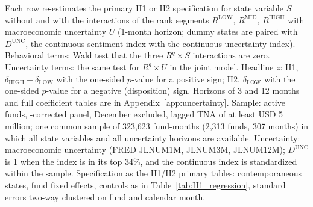 \begin{table}[!htbp]
\centering
\def\sbetab{%
\tablefont
\setlength{\tabcolsep}{4pt}%
\begin{tabular}{llccccc}
\toprule
 & & \multicolumn{2}{c}{Behavioral terms: joint $\chi^2_3$ ($p$)} & Uncertainty terms & \multicolumn{2}{c}{Headline $z$ ($p$)} \\
\cmidrule(lr){3-4}\cmidrule(lr){5-5}\cmidrule(lr){6-7}
Hyp. & State & Without $U$ & With $U$ & $\chi^2_3$ ($p$), with $S$ & Without $U$ & With $U$ \\
\midrule
H1 & $D^{\text{SENT}}$ & 6.13 (0.106) & 3.43 (0.330) & 4.85 (0.183) & $-$0.68 (0.750) & $-$1.12 (0.869) \\
H1 & $\text{SENT}^\perp$ & 7.71 (0.052) & 4.49 (0.213) & 4.53 (0.210) & +0.05 (0.481) & $-$0.11 (0.544) \\
H1 & $D^{\text{AAII}}$ & 14.22 (0.003) & 14.09 (0.003) & 7.82 (0.050) & +2.72 (0.003) & +2.78 (0.003) \\
H2 & $D^{\text{MD,Det}}$ & 19.18 ($<$0.001) & 16.38 ($<$0.001) & 4.95 (0.176) & +2.41 (0.992) & +2.05 (0.980) \\
\bottomrule
\end{tabular}%
}\sbefit
\setlength{\tabletempwidth}{\wd\tabletempbox}
\ifdim\tabletempwidth>\linewidth\setlength{\tabletempwidth}{\linewidth}\fi
\begin{minipage}{\tabletempwidth}
\captionsetup{width=\linewidth}
\caption{Sentiment or Uncertainty? Behavioral State Effects Controlling for Macroeconomic Uncertainty}\label{tab:unc_summary}
\ifdim\wd\tabletempbox>\linewidth
  \resizebox{\linewidth}{!}{\usebox{\tabletempbox}}
\else
  \usebox{\tabletempbox}
\fi
\par\medskip
\begin{singlespace}\tablefont\noindent
Each row re-estimates the primary H1 or H2 specification for state variable $S$ without and with the interactions of the rank segments $R^{\text{LOW}}$, $R^{\text{MID}}$, $R^{\text{HIGH}}$ with macroeconomic uncertainty $U$ (1-month horizon; dummy states are paired with $D^{\text{UNC}}$, the continuous sentiment index with the continuous uncertainty index). Behavioral terms: Wald test that the three $R^q\times S$ interactions are zero. Uncertainty terms: the same test for $R^q\times U$ in the joint model. Headline $z$: H1, $\delta_{\text{HIGH}}-\delta_{\text{LOW}}$ with the one-sided $p$-value for a positive sign; H2, $\delta_{\text{LOW}}$ with the one-sided $p$-value for a negative (disposition) sign. Horizons of 3 and 12 months and full coefficient tables are in Appendix~\ref{app:uncertainty}. Sample: active funds, \textcite{Evans2010}-corrected panel, December excluded, lagged TNA of at least USD 5 million; one common sample of 323,623 fund-months (2,313 funds, 307 months) in which all state variables and all uncertainty horizons are available. Uncertainty: \textcite{JuradoLudvigsonNg2015} macroeconomic uncertainty (FRED JLNUM1M, JLNUM3M, JLNUM12M); $D^{\text{UNC}}$ is 1 when the index is in its top 34\%, and the continuous index is standardized within the sample. Specification as the H1/H2 primary tables: contemporaneous states, fund fixed effects, controls as in Table~\ref{tab:H1_regression}, standard errors two-way clustered on fund and calendar month.

\end{singlespace}
\end{minipage}
\end{table}
